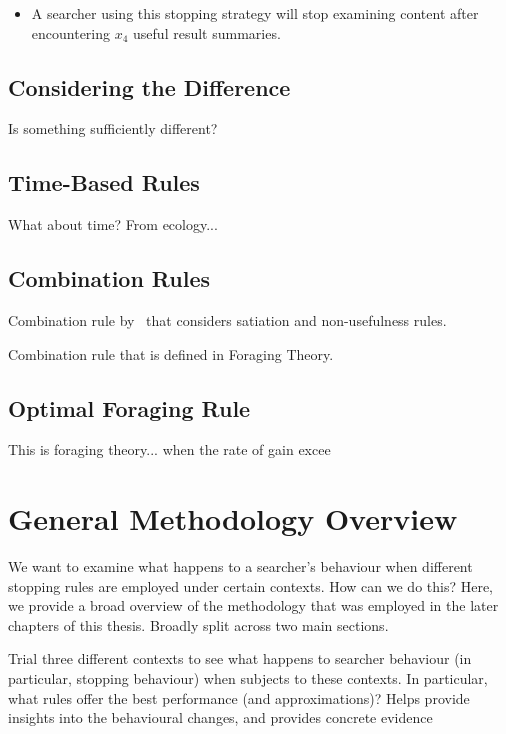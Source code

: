 \begin{itemize}
    
    \item[]{} A searcher using this stopping strategy will stop examining content after encountering $x_4$ useful result summaries.
    
\end{itemize}

\subsection{Considering the Difference}
Is something sufficiently different?

\subsection{Time-Based Rules}
What about time? From ecology...


\subsection{Combination Rules}

Combination rule by~\citealt{kraft1979stopping_rules} that considers satiation and non-usefulness rules.

Combination rule that is defined in Foraging Theory.

\subsection{Optimal Foraging Rule}
This is foraging theory... when the rate of gain excee

\section{General Methodology Overview}\label{sec:proposal:method}

We want to examine what happens to a searcher's behaviour when different stopping rules are employed under certain contexts.
How can we do this? Here, we provide a broad overview of the methodology that was employed in the later chapters of this thesis. Broadly split across two main sections.

Trial three different contexts to see what happens to searcher behaviour (in particular, stopping behaviour) when subjects to these contexts. In particular, what rules offer the best performance (and approximations)? Helps provide insights into the behavioural changes, and provides concrete evidence 

